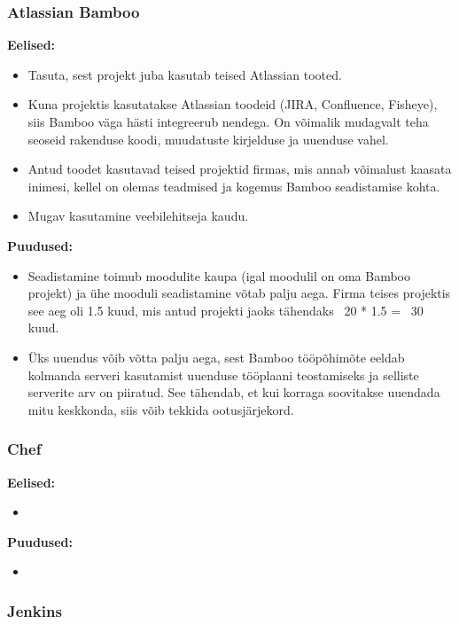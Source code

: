 \documentclass[12pt]{report}
\begin{document}
  
  \subsubsection{Atlassian Bamboo \cite{bamboo}}
  
  \textbf{Eelised:}
  \begin{itemize}
    \item Tasuta, sest projekt juba kasutab teised Atlassian tooted.
    \item Kuna projektis kasutatakse Atlassian toodeid (JIRA, Confluence, Fisheye), siis Bamboo väga hästi integreerub nendega. On võimalik mudagvalt teha seoseid rakenduse koodi, muudatuste kirjelduse ja uuenduse vahel.
    \item Antud toodet kasutavad teised projektid firmas, mis annab võimalust kaasata inimesi, kellel on olemas teadmised ja kogemus Bamboo seadistamise kohta.
    \item Mugav kasutamine veebilehitseja kaudu.
  \end{itemize}
  
  \textbf{Puudused:}
  \begin{itemize}
    \item Seadistamine toimub moodulite kaupa (igal moodulil on oma Bamboo projekt) ja ühe mooduli seadistamine võtab palju aega. Firma teises projektis see aeg oli 1.5 kuud, mis antud projekti jaoks tähendaks ~20 * 1.5 = ~30 kuud.
    \item Üks uuendus võib võtta palju aega, sest Bamboo tööpõhimõte eeldab kolmanda serveri kasutamist uuenduse tööplaani teostamiseks ja selliste serverite arv on piiratud. See tähendab, et kui korraga soovitakse uuendada mitu keskkonda, siis võib tekkida ootusjärjekord.
  \end{itemize}
  
  \subsubsection{Chef \cite{chef}}
  
  \textbf{Eelised:}
  \begin{itemize}
    \item 
  \end{itemize}
  
  \textbf{Puudused:}
  \begin{itemize}
    \item 
  \end{itemize}
  
  \subsubsection{Jenkins \cite{jenkins}}
  
\end{document}
